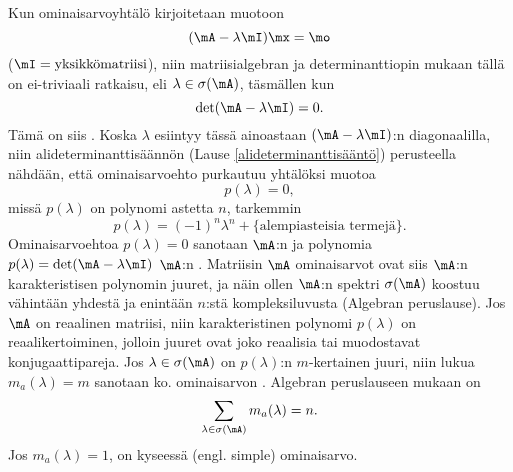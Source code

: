 Kun ominaisarvoyhtälö kirjoitetaan muotoon
\[
(\mA-\lambda\mI)\mx=\mo
\]
($\mI=\text{yksikkömatriisi}$), niin matriisialgebran ja determinanttiopin mukaan tällä on 
ei-triviaali ratkaisu, eli $\lambda\in\sigma(\mA)$, täsmällen kun
\[
\det(\mA-\lambda\mI)=0.
\]
Tämä on siis . Koska $\lambda$ esiintyy tässä ainoastaan 
$(\mA-\lambda\mI)$:n diagonaalilla, niin alideterminanttisäännön 
(Lause \ref{alideterminanttisääntö}) perusteella nähdään, että ominaisarvoehto purkautuu
yhtälöksi muotoa
\[
p(\lambda)=0,
\]
missä $p(\lambda)$ on polynomi astetta $n$, tarkemmin
\[
p(\lambda)=(-1)^n\lambda^n+\{\text{alempiasteisia termejä}\}.
\]
%
Ominaisarvoehtoa $p(\lambda)=0$ sanotaan $\mA$:n  ja
polynomia $p(\lambda)=\det(\mA-\lambda\mI)$ $\mA$:n .
Matriisin $\mA$ ominaisarvot ovat siis $\mA$:n karakteristisen polynomin juuret, ja näin ollen
$\mA$:n spektri $\sigma(\mA)$ koostuu vähintään yhdestä ja enintään $n$:stä kompleksiluvusta 
(Algebran peruslause). Jos $\mA$ on reaalinen matriisi, niin karakteristinen polynomi
$p(\lambda)$ on reaalikertoiminen, jolloin juuret ovat joko reaalisia tai muodostavat 
konjugaattipareja. Jos $\lambda\in\sigma(\mA)$ on $p(\lambda)$:n $m$-kertainen juuri, niin
lukua $m_a(\lambda)=m$ sanotaan ko. ominaisarvon
. Algebran peruslauseen mukaan on
\[
\sum_{\lambda\in\sigma(\mA)} m_a(\lambda)=n.
\]
Jos $m_a(\lambda)=1$, on kyseessä
%
 (engl. simple) ominaisarvo. 

